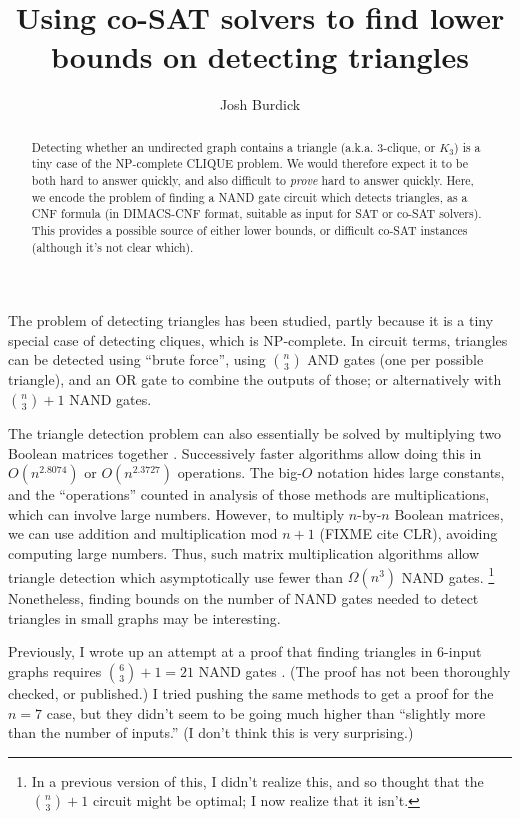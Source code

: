 \documentclass[12pt]{article}
\begin{document}
\title{Using co-SAT solvers to find lower bounds on detecting triangles}
\author{Josh Burdick}
\maketitle

\begin{abstract}
Detecting whether an undirected
graph contains a triangle (a.k.a. 3-clique, or $K_3$)
is a tiny case of the NP-complete
CLIQUE problem. We would therefore expect it to be both hard to answer
quickly, and also difficult
to {\em prove} hard to answer quickly. Here, we encode the problem of
finding a NAND gate circuit which detects triangles, as a CNF formula
(in DIMACS-CNF format,
suitable as input for SAT or co-SAT solvers). This provides a
possible source of either lower bounds, or difficult co-SAT instances
(although it's not clear which).
\end{abstract}

The problem of
detecting triangles has been studied, partly because it is a tiny special
case of detecting cliques, which is NP-complete.
In circuit terms,
triangles can be detected using ``brute force'', using ${n \choose 3}$ AND gates
(one per possible triangle), and an OR gate to combine the outputs of those;
or alternatively with
${n \choose 3} + 1$
NAND gates.

The triangle detection problem
can also essentially be solved by multiplying two Boolean matrices
together \cite{itai_finding_1977}. Successively faster algorithms allow doing this in
$O(n^{2.8074})$ \cite{strassen_gaussian_1969} or
$O(n^{2.3727})$ \cite{williams_multiplying_2012} operations. The big-$O$ notation
hides large constants, and the ``operations''
counted in analysis of those methods are multiplications, which can involve large
numbers.
However, to multiply $n$-by-$n$ Boolean matrices, we can use addition and multiplication
mod $n+1$ (FIXME cite CLR), avoiding computing large numbers.
Thus, such matrix multiplication algorithms allow triangle detection
which asymptotically use fewer than $\Omega(n^3)$ NAND gates.
\footnote{In a previous version of this, I didn't realize this, and so thought
that the ${n \choose 3} + 1$ circuit might be optimal; I now realize that it isn't.}
Nonetheless, finding bounds on the number of NAND gates needed to detect
triangles in small graphs may be interesting.

Previously, I wrote up an attempt at a proof that
finding triangles in 6-input graphs requires
${6 \choose 3} + 1 = 21$ NAND gates \cite{burdick_triangles_6_vertex}.
(The proof has not been thoroughly checked, or published.)
I tried pushing the same methods to get a proof for the
$n=7$ case, but they didn't seem to be going much higher
than ``slightly more than the number of inputs.'' 
(I don't think this is very surprising.)
\end{document}
